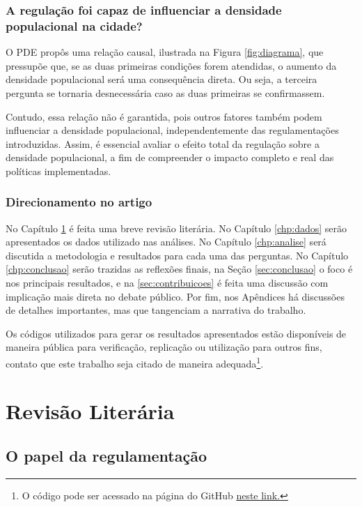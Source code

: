 \subsection*{A regulação foi capaz de influenciar a densidade populacional na cidade?} 

O PDE propôs uma relação causal, ilustrada na Figura \ref{fig:diagrama}, que pressupõe que, se as duas primeiras condições forem atendidas, o aumento da densidade populacional será uma consequência direta. Ou seja, a terceira pergunta se tornaria desnecessária caso as duas primeiras se confirmassem.

Contudo, essa relação não é garantida, pois outros fatores também podem influenciar a densidade populacional, independentemente das regulamentações introduzidas. Assim, é essencial avaliar o efeito total da regulação sobre a densidade populacional, a fim de compreender o impacto completo e real das políticas implementadas.

\subsection*{Direcionamento no artigo}

No Capítulo \ref{chp:revisao} é feita uma breve revisão literária. No Capítulo \ref{chp:dados} serão apresentados os dados utilizado nas análises. No Capítulo \ref{chp:analise} será discutida a metodologia e resultados para cada uma das perguntas. No Capítulo \ref{chp:conclusao} serão trazidas as reflexões finais, na Seção \ref{sec:conclusao} o foco é nos principais resultados, e na \ref{sec:contribuicoes} é feita uma discussão com implicação mais direta no debate público. Por fim, nos Apêndices há discussões de detalhes importantes, mas que tangenciam a narrativa do trabalho.

Os códigos utilizados para gerar os resultados apresentados estão disponíveis de maneira pública para verificação, replicação ou utilização para outros fins, contato que este trabalho seja citado de maneira adequada\footnote{O código pode ser acessado na página do GitHub \href{https://github.com/gustavo-tm}{neste link.}}.


\chapter{Revisão Literária}
\label{chp:revisao}

\section{O papel da regulamentação}

